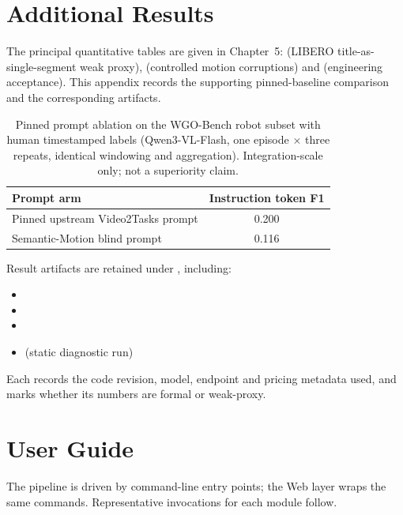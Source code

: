 \documentclass[11pt,oneside]{report}
\begin{document}
\chapter{Additional Results}
The principal quantitative tables are given in Chapter~5:
 (LIBERO title-as-single-segment weak proxy),
 (controlled motion corruptions) and
 (engineering acceptance). This appendix records the
supporting pinned-baseline comparison and the corresponding artifacts.

\begin{table}[htbp]
\centering
\caption{Pinned prompt ablation on the WGO-Bench robot subset with human
timestamped labels (Qwen3-VL-Flash, one episode $\times$ three repeats, identical
windowing and aggregation). Integration-scale only; not a superiority claim.}
\label{tab:wgo-ablation}
\begin{tabular}{lc}
\toprule
Prompt arm & Instruction token F1 \\
\midrule
Pinned upstream Video2Tasks prompt & 0.200 \\
Semantic-Motion blind prompt & 0.116 \\
\bottomrule
\end{tabular}
\end{table}

\noindent Result artifacts are retained under , including:

\begin{itemize}
    \item {}
    \item {}
    \item {}
    \item {} (static diagnostic run)
\end{itemize}

\noindent Each records the code revision, model, endpoint and pricing metadata
used, and marks whether its numbers are formal or weak-proxy.

\chapter{User Guide}
The pipeline is driven by command-line entry points; the Web layer wraps the same
commands. Representative invocations for each module follow.
\end{document}
